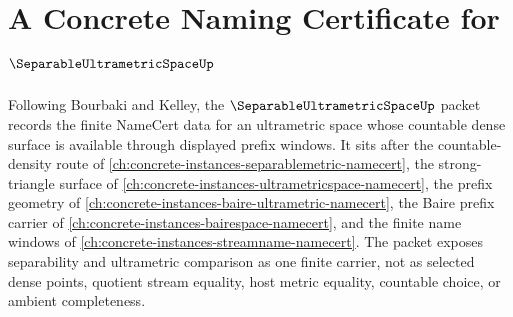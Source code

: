\chapter{A Concrete Naming Certificate for $\SeparableUltrametricSpaceUp$}
\label{ch:concrete-instances-separable-ultrametric-space-namecert}

Following Bourbaki and Kelley, the $\SeparableUltrametricSpaceUp$ packet records the finite NameCert data for an ultrametric space whose countable dense surface is available through displayed prefix windows. It sits after the countable-density route of \autoref{ch:concrete-instances-separablemetric-namecert}, the strong-triangle surface of \autoref{ch:concrete-instances-ultrametricspace-namecert}, the prefix geometry of \autoref{ch:concrete-instances-baire-ultrametric-namecert}, the Baire prefix carrier of \autoref{ch:concrete-instances-bairespace-namecert}, and the finite name windows of \autoref{ch:concrete-instances-streamname-namecert}. The packet exposes separability and ultrametric comparison as one finite carrier, not as selected dense points, quotient stream equality, host metric equality, countable choice, or ambient completeness.

